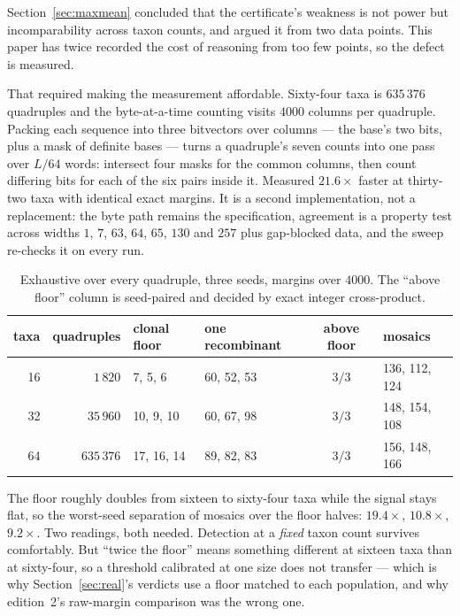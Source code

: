 \documentclass[11pt,a4paper]{article}
\theoremstyle{definition}
\theoremstyle{remark}
\begin{document}
Section~\ref{sec:maxmean} concluded that the certificate's weakness is not power
but incomparability across taxon counts, and argued it from two data points. This
paper has twice recorded the cost of reasoning from too few points, so the defect
is measured.

That required making the measurement affordable. Sixty-four taxa is $635\,376$
quadruples and the byte-at-a-time counting visits $4000$ columns per quadruple.
Packing each sequence into three bitvectors over columns --- the base's two bits,
plus a mask of definite bases --- turns a quadruple's seven counts into one pass
over $L/64$ words: intersect four masks for the common columns, then count
differing bits for each of the six pairs inside it. Measured $21.6\times$ faster
at thirty-two taxa with identical exact margins. It is a second implementation,
not a replacement: the byte path remains the specification, agreement is a
property test across widths $1$, $7$, $63$, $64$, $65$, $130$ and $257$ plus
gap-blocked data, and the sweep re-checks it on every run.

\begin{table}[h]
\centering\small
\caption{Exhaustive over every quadruple, three seeds, margins over $4000$. The
``above floor'' column is seed-paired and decided by exact integer
cross-product.}
\label{tab:scale}
\begin{tabular}{@{}rrllcl@{}}
\toprule
taxa & quadruples & clonal floor & one recombinant & above floor & mosaics \\
\midrule
16 & $1\,820$ & 7, 5, 6 & 60, 52, 53 & $3/3$ & 136, 112, 124 \\
32 & $35\,960$ & 10, 9, 10 & 60, 67, 98 & $3/3$ & 148, 154, 108 \\
64 & $635\,376$ & 17, 16, 14 & 89, 82, 83 & $3/3$ & 156, 148, 166 \\
\bottomrule
\end{tabular}
\end{table}

The floor roughly doubles from sixteen to sixty-four taxa while the signal stays
flat, so the worst-seed separation of mosaics over the floor halves:
$19.4\times$, $10.8\times$, $9.2\times$. Two readings, both needed. Detection at
a \emph{fixed} taxon count survives comfortably. But ``twice the floor'' means
something different at sixteen taxa than at sixty-four, so a threshold
calibrated at one size does not transfer --- which is why
Section~\ref{sec:real}'s verdicts use a floor matched to each population, and
why edition~2's raw-margin comparison was the wrong one.
\end{document}
